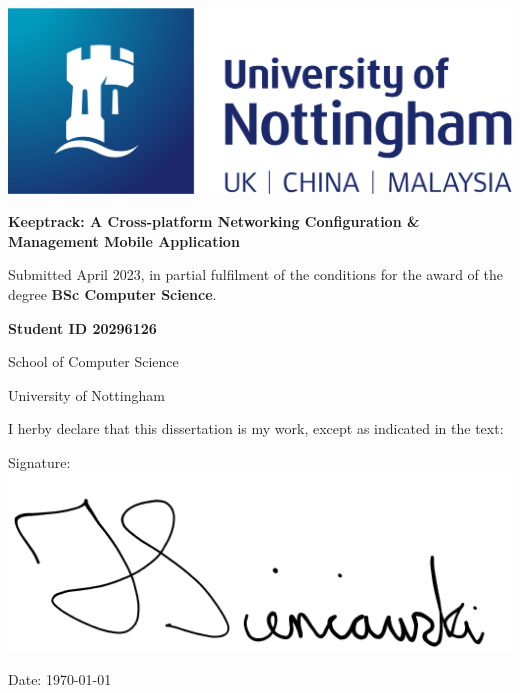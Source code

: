 \documentclass [11pt,a4paper]{article}
\begin{document}
 
\thispagestyle{empty}
\begin{center}
    \centering
    \includegraphics[width=0.5\linewidth]{images/nottingham-logo.png}
    \vspace{2.5cm}
    {\Large \par}
    {\LARGE \textbf{Keeptrack: A Cross-platform Networking Configuration \& Management Mobile Application}\par}
    \vspace{1.5cm}
    {\small Submitted April 2023, in partial fulfilment of \break the conditions for the award of the degree \textbf{BSc Computer Science}.\par}
    \vspace{1cm}
    {\Large\textbf{Student ID 20296126}\par}
    \vspace{1cm}
    {\large School of Computer Science\par}
    {\normalsize University of Nottingham\par}
    \vspace{2cm}
    {\normalsize I herby declare that this dissertation is my work, except as indicated in the text:\par}
    \vspace{3cm}
    {\normalsize Signature: \underline{ \includegraphics[width=0.25\linewidth]{images/signature.png}}\par}
    \vspace{0.25cm}
    {\normalsize Date: \today\par}
\end{center}

\pagebreak
{}
\pagebreak
\end{document}
